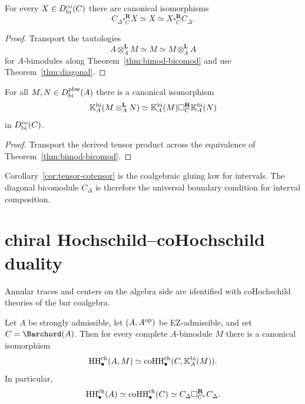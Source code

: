 \begin{corollary}
\ClaimStatusProvedHere
\label{cor:unit}
For every $X\in D^{\mathrm{co}}_{\mathrm{bi}}(C)$ there are canonical isomorphisms
\[
C_\Delta \square_C^{\mathbf R} X \simeq X \simeq X \square_C^{\mathbf R} C_\Delta.
\]
\end{corollary}

\begin{proof}
Transport the tautologies
\[
A\otimes_A^{\mathbf L} M\simeq M\simeq M\otimes_A^{\mathbf L} A
\]
for $A$-bimodules along Theorem~\ref{thm:bimod-bicomod} and use
Theorem~\ref{thm:diagonal}.
\end{proof}

\begin{corollary}
\ClaimStatusProvedHere
\label{cor:tensor-cotensor}
For all $M,N\in D^{\mathrm{pbw}}_{\mathrm{bi}}(A)$ there is a canonical isomorphism
\[
\mathbb{K}_A^{\mathrm{bi}}(M\otimes_A^{\mathbf L} N)
\simeq
\mathbb{K}_A^{\mathrm{bi}}(M)\square_C^{\mathbf R}\mathbb{K}_A^{\mathrm{bi}}(N)
\]
in $D^{\mathrm{co}}_{\mathrm{bi}}(C)$.
\end{corollary}

\begin{proof}
Transport the derived tensor product across the equivalence of
Theorem~\ref{thm:bimod-bicomod}.
\end{proof}

\begin{remark}
Corollary~\ref{cor:tensor-cotensor} is the coalgebraic gluing law for intervals.
The diagonal bicomodule $C_\Delta$ is therefore the universal boundary condition for interval
composition.
\end{remark}

\section{chiral Hochschild--coHochschild duality}
\label{sec:HH-coHH}

Annular traces and centers on the algebra side are identified with coHochschild theories of the bar
coalgebra.

\begin{theorem}
\ClaimStatusProvedHere
\label{thm:HH-coHH-homology}
Let $A$ be strongly admissible, let $(A,A^{\mathrm{op}})$ be EZ-admissible, and set $C=\Barchord(A)$.
Then for every complete $A$-bimodule $M$ there is a canonical isomorphism
\[
\operatorname{HH}^{\mathrm{ch}}_\bullet(A,M)\simeq
\operatorname{coHH}^{\mathrm{ch}}_\bullet(C,\mathbb{K}_A^{\mathrm{bi}}(M)).
\]
In particular,
\[
\operatorname{HH}^{\mathrm{ch}}_\bullet(A)\simeq \operatorname{coHH}^{\mathrm{ch}}_\bullet(C)
\simeq
C_\Delta \square_{C^e}^{\mathbf R} C_\Delta.
\]
\end{theorem}

